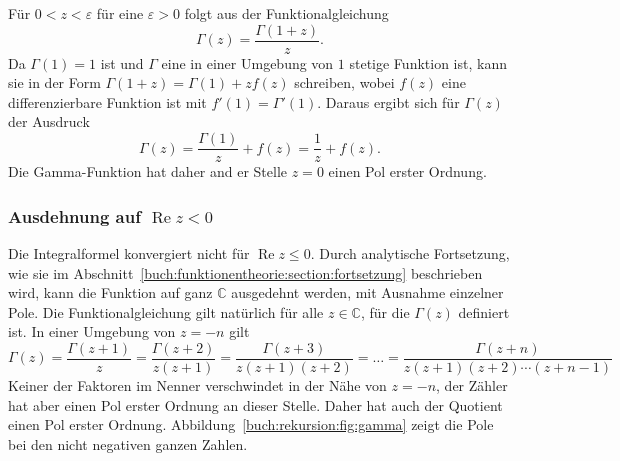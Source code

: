 Für $0<z<\varepsilon$ für eine $\varepsilon >0$ folgt aus der 
Funktionalgleichung
\[
\Gamma(z) = \frac{\Gamma(1+z)}{z}.
\]
Da $\Gamma(1)=1$ ist und $\Gamma$ eine in einer
Umgebung von $1$ stetige Funktion ist, kann sie in der Form
\(
\Gamma(1+z)=\Gamma(1) + zf(z)
\)
schreiben, wobei  $f(z)$ eine differenzierbare Funktion ist mit
$f'(1)=\Gamma'(1)$.
Daraus ergibt sich für $\Gamma(z)$ der Ausdruck
\[
\Gamma(z) = \frac{\Gamma(1)}{z} + f(z) = \frac{1}{z} + f(z).
\]
Die Gamma-Funktion hat daher and er Stelle $z=0$ einen Pol erster Ordnung.

\subsubsection{Ausdehnung auf $\operatorname{Re}z<0$}
Die Integralformel konvergiert nicht für $\operatorname{Re}z\le 0$.
Durch analytische Fortsetzung, wie sie im
Abschnitt~\ref{buch:funktionentheorie:section:fortsetzung}
beschrieben wird, kann die Funktion auf ganz $\mathbb{C}$ ausgedehnt
werden, mit Ausnahme einzelner Pole.
Die Funktionalgleichung gilt natürlich für alle $z\in\mathbb{C}$,
für die $\Gamma(z)$ definiert ist.
In einer Umgebung von $z=-n$ gilt
\[
\Gamma(z)
=
\frac{\Gamma(z+1)}{z}
=
\frac{\Gamma(z+2)}{z(z+1)}
=
\frac{\Gamma(z+3)}{z(z+1)(z+2)}
=
\dots
=
\frac{\Gamma(z+n)}{z(z+1)(z+2)\cdots(z+n-1)}
\]
Keiner der Faktoren im Nenner verschwindet in der Nähe von $z=-n$, der
Zähler hat aber einen Pol erster Ordnung an dieser Stelle.
Daher hat auch der Quotient einen Pol erster Ordnung.
Abbildung~\ref{buch:rekursion:fig:gamma} zeigt die Pole bei den
nicht negativen ganzen Zahlen.

